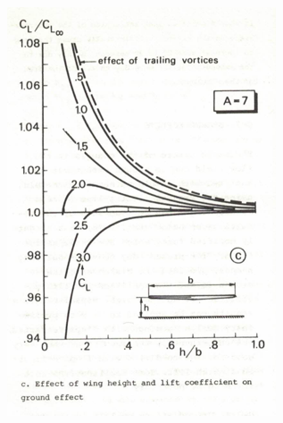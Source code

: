 \begin{figure}[!ht]
\begin{minipage}{.48\textwidth}
      \includegraphics[width=\linewidth]{figures/cl2_cl3.png}
      \label{fig:lift_level2_3}
    \end{minipage}
\end{figure}

